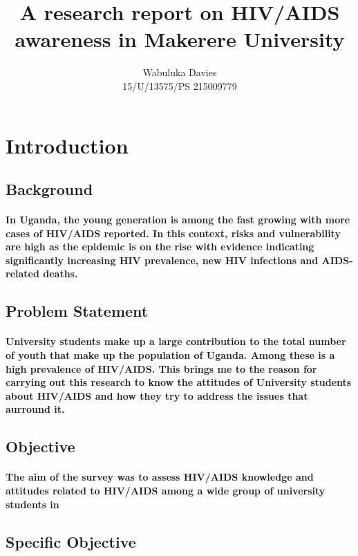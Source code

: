 \documentclass{article}
\begin{document}
\title{A research report on HIV/AIDS awareness in Makerere University}
\author{Wabuluka Davies \\ 15/U/13575/PS 215009779}
\maketitle

\section{ Introduction}
\subsection{Background}
\paragraph{In Uganda, the young generation is among the fast growing with more cases of HIV/AIDS reported. In this context, risks and vulnerability are high as the epidemic is on the rise with evidence indicating significantly increasing HIV prevalence, new HIV infections and AIDS-related deaths.}

\subsection{Problem Statement}
\paragraph{University students make up a large contribution to the total number of youth that make up the population of Uganda. Among these is a high prevalence of HIV/AIDS. This brings me to the reason for carrying out this research to know the attitudes of University students about HIV/AIDS and how they try to address the issues that aurround it.}

\subsection{Objective}
\paragraph{The aim of the survey was to assess HIV/AIDS knowledge and attitudes related to HIV/AIDS among a wide group of university students in}

\subsection{Specific Objective}
\end{document}
